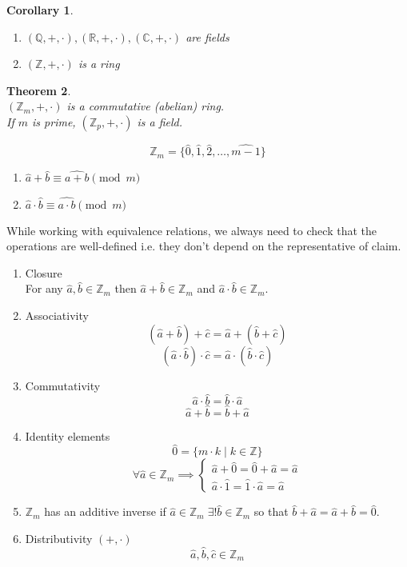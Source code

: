 \documentclass[letterpaper, 12pt]{article}
\newtheorem{theorem}{Theorem}[section]
\newtheorem{corollary}[theorem]{Corollary}
\newcommand{\Z}{\mathbb{Z}}
\newcommand{\Q}{\mathbb{Q}}
\newcommand{\R}{\mathbb{R}}
\newcommand{\C}{\mathbb{C}}
\newcommand{\0}{\emptyset}
\begin{document}
    \begin{corollary}
        \hfill
        \begin{enumerate}
            \item $(\Q, +, \cdot), (\R, +, \cdot), (\C, +, \cdot)$ are fields
            \item $(\Z, +, \cdot)$ is a ring
        \end{enumerate}
    \end{corollary}
    \begin{theorem}
        \hfill \\
        $(\Z_m, +, \cdot)$ is a commutative (abelian) ring. \\
        If $m$ is prime, $(\Z_p, +, \cdot)$ is a field.
    \end{theorem}
    \[\Z_m = \{\hat{0}, \hat{1}, \hat{2}, \dots, \widehat{m-1}\}\]
    \begin{enumerate}
        \item $\hat{a} + \hat{b} \equiv \widehat{a + b} \pmod m$
        \item $\hat{a} \cdot \hat{b} \equiv \widehat{a \cdot b} \pmod m$
    \end{enumerate}
    While working with equivalence relations, we always need to check that the operations are 
    well-defined i.e. they don't depend on the representative of claim.
    \begin{enumerate}
        \item Closure \\
        For any $\hat{a}, \hat{b} \in \Z_m$ then $\hat{a} + \hat{b} \in \Z_m$ and 
        $\hat{a} \cdot \hat{b} \in \Z_m$.
        \item Associativity
        \[(\hat{a} + \hat{b}) + \hat{c} = \hat{a} + (\hat{b} + \hat{c})\]
        \[(\hat{a} \cdot \hat{b}) \cdot \hat{c} = \hat{a} \cdot (\hat{b} \cdot \hat{c})\]
        \item Commutativity
        \[\hat{a} \cdot \hat{b} = \hat{b} \cdot \hat{a}\]
        \[\hat{a} + \hat{b} = \hat{b} + \hat{a}\]
        \item Identity elements
        \[\hat{0} = \{m \cdot k \mid k \in \Z\}\]
        \[\forall \hat{a} \in \Z_m \implies \begin{cases}
            \hat{a} + \hat{0} = \hat{0} + \hat{a} = \hat{a} \\
            \hat{a} \cdot \hat{1} = \hat{1} \cdot \hat{a} = \hat{a}
        \end{cases}\]
        \item $\Z_m$ has an additive inverse if $\hat{a} \in \Z_m \; \exists! \hat{b} \in \Z_m$ 
        so that $\hat{b} + \hat{a} = \hat{a} + \hat{b} = \hat{0}$.
        \item Distributivity $(+, \cdot)$
        \[\hat{a}, \hat{b}, \hat{c} \in \Z_m\]
        \[\]
    \end{enumerate}
\end{document}
